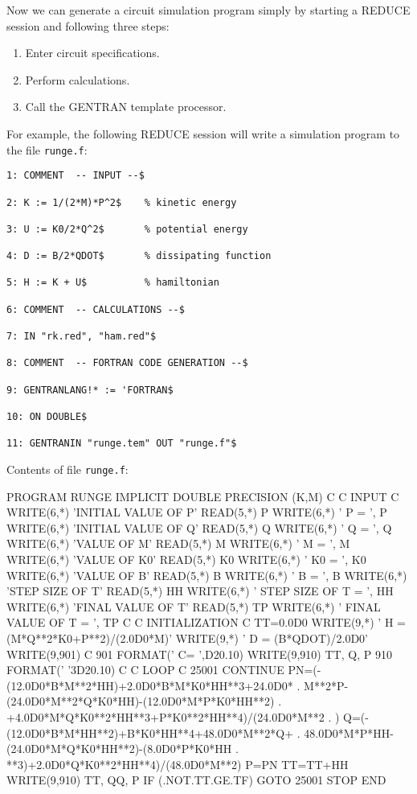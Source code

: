 Now we can generate a circuit simulation program simply by starting
a REDUCE session and following three steps:
\begin{enumerate}
\item Enter circuit specifications.
\item Perform calculations.
\item Call the GENTRAN template processor.
\end{enumerate}
For example, the following REDUCE session will write a simulation
program to the file {\tt runge.f}:
\begin{verbatim}
1: COMMENT  -- INPUT --$

2: K := 1/(2*M)*P^2$    % kinetic energy

3: U := K0/2*Q^2$       % potential energy

4: D := B/2*QDOT$       % dissipating function

5: H := K + U$          % hamiltonian

6: COMMENT  -- CALCULATIONS --$

7: IN "rk.red", "ham.red"$

8: COMMENT  -- FORTRAN CODE GENERATION --$

9: GENTRANLANG!* := 'FORTRAN$

10: ON DOUBLE$

11: GENTRANIN "runge.tem" OUT "runge.f"$
\end{verbatim}

Contents of file {\tt runge.f}:
\begin{framedverbatim}
      PROGRAM RUNGE
      IMPLICIT DOUBLE PRECISION (K,M)
C
C  INPUT
C
      WRITE(6,*) 'INITIAL VALUE OF P'
      READ(5,*) P
      WRITE(6,*) ' P = ', P
      WRITE(6,*) 'INITIAL VALUE OF Q'
      READ(5,*) Q
      WRITE(6,*) ' Q = ', Q
      WRITE(6,*) 'VALUE OF M'
      READ(5,*) M
      WRITE(6,*) ' M = ', M
      WRITE(6,*) 'VALUE OF K0'
      READ(5,*) K0
      WRITE(6,*) ' K0 = ', K0
      WRITE(6,*) 'VALUE OF B'
      READ(5,*) B
      WRITE(6,*) ' B = ', B
      WRITE(6,*) 'STEP SIZE OF T'
      READ(5,*) HH
      WRITE(6,*) ' STEP SIZE OF T = ', HH
      WRITE(6,*) 'FINAL VALUE OF T'
      READ(5,*) TP
      WRITE(6,*) ' FINAL VALUE OF T = ', TP
C
C  INITIALIZATION
C
      TT=0.0D0
      WRITE(9,*) ' H = (M*Q**2*K0+P**2)/(2.0D0*M)'
      WRITE(9,*) ' D = (B*QDOT)/2.0D0'
      WRITE(9,901) C
901   FORMAT(' C= ',D20.10)
      WRITE(9,910) TT, Q, P
910   FORMAT(' '3D20.10)
C
C  LOOP
C
25001 CONTINUE
          PN=(-(12.0D0*B*M**2*HH)+2.0D0*B*M*K0*HH**3+24.0D0*
     .     M**2*P-(24.0D0*M**2*Q*K0*HH)-(12.0D0*M*P*K0*HH**2)
     .     +4.0D0*M*Q*K0**2*HH**3+P*K0**2*HH**4)/(24.0D0*M**2
     .     )
          Q=(-(12.0D0*B*M*HH**2)+B*K0*HH**4+48.0D0*M**2*Q+
     .     48.0D0*M*P*HH-(24.0D0*M*Q*K0*HH**2)-(8.0D0*P*K0*HH
     .     **3)+2.0D0*Q*K0**2*HH**4)/(48.0D0*M**2)
          P=PN
          TT=TT+HH
          WRITE(9,910) TT, QQ, P
      IF (.NOT.TT.GE.TF) GOTO 25001
      STOP
      END
\end{framedverbatim}

